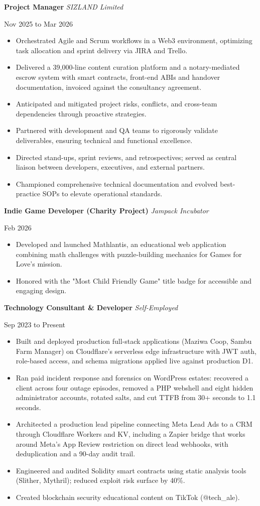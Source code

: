\documentclass[10pt,a4paper]{article}
\newcommand{\role}[3]{%
  \par\vspace{0.55em}%
  {\sffamily\bfseries #1} \hfill {\small\itshape #2}%
  \par {\small #3}\par%
  \vspace{0.15em}%
}
\begin{document}
\role{Project Manager}{SIZLAND Limited}{Nov 2025 to Mar 2026}
\begin{itemize}[leftmargin=1.5em]
  \item Orchestrated Agile and Scrum workflows in a Web3 environment, optimizing task allocation and sprint delivery via JIRA and Trello.
  \item Delivered a 39,000-line content curation platform and a notary-mediated escrow system with smart contracts, front-end ABIs and handover documentation, invoiced against the consultancy agreement.
  \item Anticipated and mitigated project risks, conflicts, and cross-team dependencies through proactive strategies.
  \item Partnered with development and QA teams to rigorously validate deliverables, ensuring technical and functional excellence.
  \item Directed stand-ups, sprint reviews, and retrospectives; served as central liaison between developers, executives, and external partners.
  \item Championed comprehensive technical documentation and evolved best-practice SOPs to elevate operational standards.
\end{itemize}

\role{Indie Game Developer (Charity Project)}{Jampack Incubator}{Feb 2026}
\begin{itemize}[leftmargin=1.5em]
  \item Developed and launched Mathlantis, an educational web application combining math challenges with puzzle-building mechanics for Games for Love's mission.
  \item Honored with the "Most Child Friendly Game" title badge for accessible and engaging design.
\end{itemize}

\role{Technology Consultant \& Developer}{Self-Employed}{Sep 2023 to Present}
\begin{itemize}[leftmargin=1.5em]
  \item Built and deployed production full-stack applications (Maziwa Coop, Sambu Farm Manager) on Cloudflare's serverless edge infrastructure with JWT auth, role-based access, and schema migrations applied live against production D1.
  \item Ran paid incident response and forensics on WordPress estates: recovered a client across four outage episodes, removed a PHP webshell and eight hidden administrator accounts, rotated salts, and cut TTFB from 30+ seconds to 1.1 seconds.
  \item Architected a production lead pipeline connecting Meta Lead Ads to a CRM through Cloudflare Workers and KV, including a Zapier bridge that works around Meta's App Review restriction on direct lead webhooks, with deduplication and a 90-day audit trail.
  \item Engineered and audited Solidity smart contracts using static analysis tools (Slither, Mythril); reduced exploit risk surface by 40\%.
  \item Created blockchain security educational content on TikTok (@tech\_ale).
\end{itemize}
\end{document}
